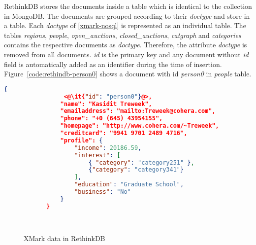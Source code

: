 RethinkDB stores the documents inside a table which is identical to the collection in MongoDB. 
The documents are grouped according to their \textit{doctype} and store in a table.
Each \textit{doctype} of \ref{xmark-nosql} is represented as an individual table. 
The tables \textit{regions}, \textit{people}, \textit{open\_auctions}, \textit{closed\_auctions}, \textit{catgraph} and \textit{categories} contains the respective documents as \textit{doctype}. Therefore, the attribute \textit{doctype} is removed from all documents.  \textit{id} is the primary key and any document without \textit{id} field is automatically added as an identifier during the time of insertion. Figure~\ref{code:rethindb-person0} shows a document with id \textit{person0} in \textit{people} table.


\newbox\rethinkdbXmarkChart
\begin{lrbox}{\rethinkdbXmarkChart}
\end{lrbox}



\newbox\rethinkdbXmarkDocument
\begin{lrbox}{\rethinkdbXmarkDocument}
\begin{lstlisting}[language=JSON,basicstyle=\ttfamily\footnotesize]
        	{
        		 <@\it{"id": "person0"}@>,
        		"name": "Kasidit Treweek",
        		"emailaddress": "mailto:Treweek@cohera.com",
        		"phone": "+0 (645) 43954155",
        		"homepage": "http://www.cohera.com/~Treweek",
        		"creditcard": "9941 9701 2489 4716",
        		"profile": {
        			"income": 20186.59,
        			"interest": [
        			    { "category": "category251" },
        				{"category": "category341"}
        			],
        			"education": "Graduate School",
        			"business": "No"
        		}
        	}
\end{lstlisting}
\end{lrbox}

\begin{figure}[H]
\centering
{}
\\
\centering
{}

\caption{XMark data in RethinkDB}
\label{xmark-rethinkdb-figure}
\end{figure}
